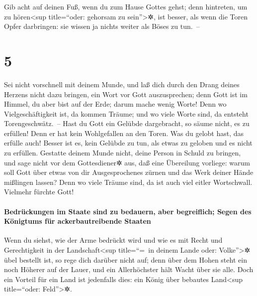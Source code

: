 Gib acht auf deinen Fuß, wenn du zum Hause Gottes gehst;
denn hintreten, um zu hören\textless sup title=``oder: gehorsam zu
sein''\textgreater✲, ist besser, als wenn die Toren Opfer darbringen:
sie wissen ja nichts weiter als Böses zu tun.~--

\hypertarget{section-4}{%
\section{5}\label{section-4}}

Sei nicht vorschnell mit deinem Munde, und laß dich durch
den Drang deines Herzens nicht dazu bringen, ein Wort vor Gott
auszusprechen; denn Gott ist im Himmel, du aber bist auf der Erde; darum
mache wenig Worte! Denn wo Vielgeschäftigkeit ist, da
kommen Träume; und wo viele Worte sind, da entsteht Torengeschwätz.~--
Hast du Gott ein Gelübde dargebracht, so säume nicht, es
zu erfüllen! Denn er hat kein Wohlgefallen an den Toren. Was du gelobt
hast, das erfülle auch! Besser ist es, kein Gelübde zu
tun, als etwas zu geloben und es nicht zu erfüllen.
Gestatte deinem Munde nicht, deine Person in Schuld zu
bringen, und sage nicht vor dem Gottesdiener✲ aus, daß eine Übereilung
vorliege: warum soll Gott über etwas von dir Ausgesprochenes zürnen und
das Werk deiner Hände mißlingen lassen? Denn wo viele
Träume sind, da ist auch viel eitler Wortschwall. Vielmehr fürchte Gott!

\hypertarget{bedruxfcckungen-im-staate-sind-zu-bedauern-aber-begreiflich-segen-des-kuxf6nigtums-fuxfcr-ackerbautreibende-staaten}{%
\paragraph{Bedrückungen im Staate sind zu bedauern, aber begreiflich;
Segen des Königtums für ackerbautreibende
Staaten}\label{bedruxfcckungen-im-staate-sind-zu-bedauern-aber-begreiflich-segen-des-kuxf6nigtums-fuxfcr-ackerbautreibende-staaten}}

Wenn du siehst, wie der Arme bedrückt wird und wie es mit
Recht und Gerechtigkeit in der Landschaft\textless sup title=``=~in
deinem Lande oder: Volke''\textgreater✲ übel bestellt ist, so rege dich
darüber nicht auf; denn über dem Hohen steht ein noch Höherer auf der
Lauer, und ein Allerhöchster hält Wacht über sie alle.
Doch ein Vorteil für ein Land ist jedenfalls dies: ein
König über bebautes Land\textless sup title=``oder: Feld''\textgreater✲.

